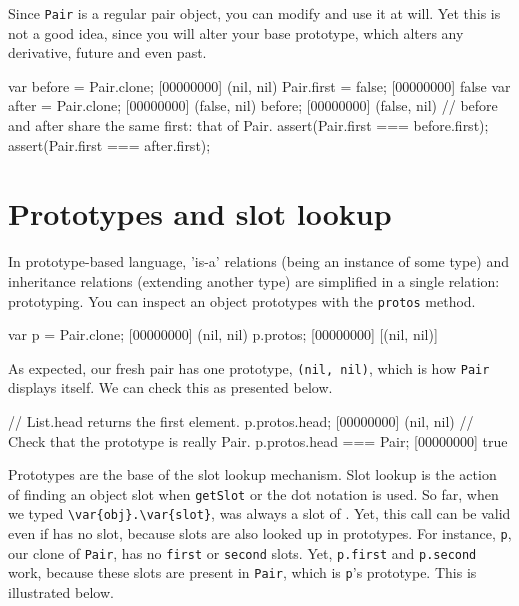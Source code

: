 Since \lstinline|Pair| is a regular pair object, you can modify and
use it at will. Yet this is not a good idea, since you will alter your
base prototype, which alters any derivative, future and even past.

\begin{urbiscript}
var before = Pair.clone;
[00000000] (nil, nil)
Pair.first = false;
[00000000] false
var after = Pair.clone;
[00000000] (false, nil)
before;
[00000000] (false, nil)
// before and after share the same first: that of Pair.
assert(Pair.first === before.first);
assert(Pair.first === after.first);
\end{urbiscript}

\section{Prototypes and slot lookup}

In prototype-based language, 'is-a' relations (being an instance of
some type) and inheritance relations (extending another type) are
simplified in a single relation: prototyping. You can inspect an
object prototypes with the \lstinline{protos} method.

\begin{urbiscript}
var p = Pair.clone;
[00000000] (nil, nil)
p.protos;
[00000000] [(nil, nil)]
\end{urbiscript}

As expected, our fresh pair has one prototype, \lstinline|(nil, nil)|,
which is how \lstinline|Pair| displays itself. We can check this as
presented below.

\begin{urbiscript}[firstnumber=last]
// List.head returns the first element.
p.protos.head;
[00000000] (nil, nil)
// Check that the prototype is really Pair.
p.protos.head === Pair;
[00000000] true
\end{urbiscript}

Prototypes are the base of the slot lookup mechanism. Slot lookup is
the action of finding an object slot when \lstinline{getSlot} or the
dot notation is used. So far, when we typed
\lstinline|\var{obj}.\var{slot}|,  was always a slot of
.  Yet, this call can be valid even if  has no
 slot, because slots are also looked up in prototypes. For
instance, \lstinline|p|, our clone of \lstinline|Pair|, has no
\lstinline|first| or \lstinline|second| slots. Yet,
\lstinline|p.first| and \lstinline|p.second| work, because these slots
are present in \lstinline|Pair|, which is \lstinline|p|'s
prototype. This is illustrated below.

